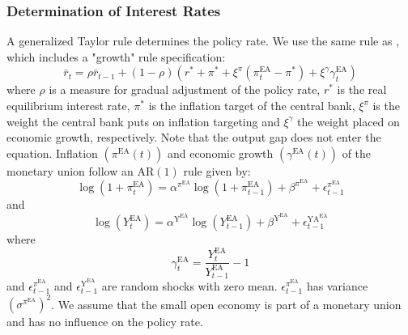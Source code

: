 \subsubsection{Determination of Interest Rates}
A generalized Taylor rule \citep{taylor_discretion_1993} determines the policy rate. We use the same rule as \cite{blattner_towards_2010}, which includes a "growth" rule specification: 
\begin{equation}
    \bar{r}_t=\rho \bar{r}_{t-1}+(1-\rho)\left(r^*+\pi^*+\xi^\pi\left(\pi^{\mathrm{EA}}_t-\pi^*\right)+\xi^\gamma \gamma^{\mathrm{EA}}_t\right)
\end{equation}
where $\rho$ is a measure for gradual adjustment of the policy rate, $r^*$ is the real equilibrium interest rate, $\pi^*$ is the inflation target of the central bank, $ \xi^\pi$ is the weight the central bank puts on inflation targeting and $\xi^\gamma$ the weight placed on economic growth, respectively. Note that the output gap does not enter the equation. Inflation $\left(\pi^{\mathrm{EA}}(t)\right)$ and economic growth $\left(\gamma^{\mathrm{EA}}(t)\right)$ of the monetary union follow an $\mathrm{AR}(1)$  rule given by:
\begin{equation}
    \log \left(1+\pi^{\mathrm{EA}}_t\right)=\alpha^{\pi^{\mathrm{EA}}} \log \left(1+\pi^{\mathrm{EA}}_{t-1}\right)+\beta^{\pi^{\mathrm{EA}}}+\epsilon^{\pi^{\mathrm{EA}}}_{t-1}
\end{equation}
and
\begin{equation}
    \log \left(Y^{\mathrm{EA}}_{t}\right)=\alpha^{\mathrm{Y}^{\mathrm{EA}}} \log \left(Y^{\mathrm{EA}}_{t-1}\right)+\beta^{\mathrm{Y}^{\mathrm{EA}}}+\epsilon^{\mathrm{YA}^{\mathrm{EA}}}_{t-1}
\end{equation}
where
\begin{equation}
    \gamma^{\mathrm{EA}}_t=\frac{Y^{\mathrm{EA}}_t}{Y^{\mathrm{EA}}_{t-1}}-1
\end{equation}
and $\epsilon^{\pi^{\mathrm{EA}}}_{t-1}$ and $\epsilon^{\mathrm{Y}^{\mathrm{EA}}}_{t-1}$ are random shocks with zero mean. $\epsilon^{\pi^{\mathrm{EA}}}_{t-1}$ has variance $\left(\sigma^{\pi^{\mathrm{EA}}}\right)^2$. We assume that the small open economy is part of a monetary union and has no influence on the policy rate. 

